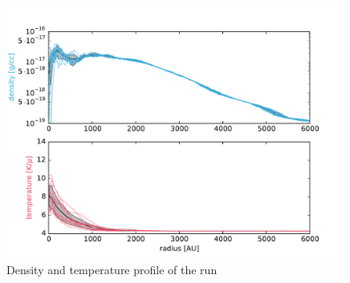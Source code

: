 \begin{figure}[!htb]
 \centering
 \includegraphics[width=0.99\textwidth]{Figures/var_rt_profiles/timeave_n100c1_6000AU}
 \captionsetup{justification=justified,singlelinecheck=false,width=\linewidth}
 \decoRule
 \caption[ profiles]{Density and temperature profile of the  run}
\label{fig:n100c1.0_profile}
\end{figure}
\FloatBarrier

